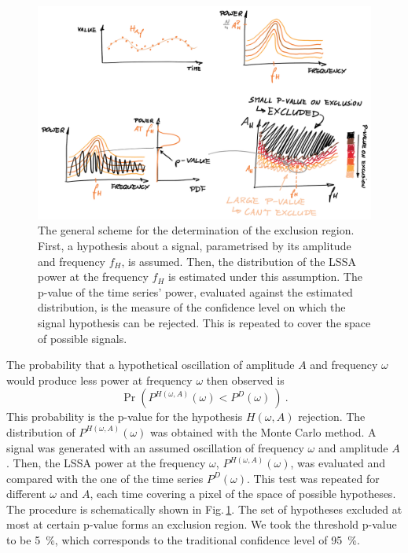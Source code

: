 \begin{figure}
  \centering \includegraphics[width=\linewidth]{gfx/axions/exclusion_region.png}
  \caption{The general scheme for the determination of the exclusion region. First, a hypothesis about a signal, parametrised by its amplitude and frequency $f_H$, is assumed. Then, the distribution of the LSSA power at the frequency $f_H$ is estimated under this assumption. The p-value of the time series' power, evaluated against the estimated distribution, is the measure of the confidence level on which the signal hypothesis can be rejected. This is repeated to cover the space of possible signals.}\label{fig:exclusion_region}
\end{figure}

The probability that a hypothetical oscillation of amplitude $A$ and frequency $\omega$ would produce less power at frequency $\omega$ then observed is
\begin{equation}
  \Pr\left( P^{H(\omega, A)}(\omega) < P^D(\omega)\ \right) \ .
\end{equation}
This probability is the p-value for the hypothesis $H(\omega, A)$ rejection. The distribution of $P^{H(\omega, A)}(\omega)$ was obtained with the Monte Carlo method.
A signal was generated with an assumed oscillation of frequency $\omega$ and amplitude $A$. Then, the LSSA power at the frequency $\omega$, $P^{H(\omega, A)}(\omega)$, was evaluated and compared with the one of the time series $P^D(\omega)$.
This test was repeated for different $\omega$ and $A$, each time covering a pixel of the space of possible hypotheses. The procedure is schematically shown in Fig.\,\ref{fig:exclusion_region}.
The set of hypotheses excluded at most at certain p-value forms an exclusion region. We took the threshold p-value to be \SI{5}{\percent}, which corresponds to the traditional confidence level of \SI{95}{\percent}.

